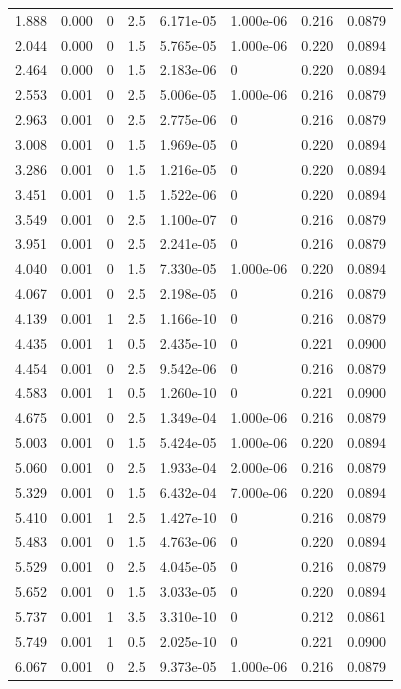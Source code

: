 \documentclass[preview]{standalone}
\begin{document}
{{\begin{tabular}{L{1.2cm}C{1.2cm} C{0.3cm}C{0.5cm} C{1.4cm}C{1.4cm} C{1.4cm}C{1.4cm}}
  1.888  &  0.000  & 0     & 2.5 &  6.171e-05  & 1.000e-06  & 0.216 &  0.0879   \\ 
  2.044  &  0.000  & 0     & 1.5 &  5.765e-05  & 1.000e-06  & 0.220 &  0.0894   \\ 
  2.464  &  0.000  & 0     & 1.5 &  2.183e-06  & 0  & 0.220 &  0.0894   \\ 
  2.553  &  0.001  & 0     & 2.5 &  5.006e-05  & 1.000e-06  & 0.216 &  0.0879   \\ 
  2.963  &  0.001  & 0     & 2.5 &  2.775e-06  & 0  & 0.216 &  0.0879   \\ 
  3.008  &  0.001  & 0     & 1.5 &  1.969e-05  & 0  & 0.220 &  0.0894   \\ 
  3.286  &  0.001  & 0     & 1.5 &  1.216e-05  & 0  & 0.220 &  0.0894   \\ 
  3.451  &  0.001  & 0     & 1.5 &  1.522e-06  & 0  & 0.220 &  0.0894   \\ 
  3.549  &  0.001  & 0     & 2.5 &  1.100e-07  & 0  & 0.216 &  0.0879   \\ 
  3.951  &  0.001  & 0     & 2.5 &  2.241e-05  & 0  & 0.216 &  0.0879   \\ 
  4.040  &  0.001  & 0     & 1.5 &  7.330e-05  & 1.000e-06  & 0.220 &  0.0894   \\ 
  4.067  &  0.001  & 0     & 2.5 &  2.198e-05  & 0  & 0.216 &  0.0879   \\ 
  4.139  &  0.001  & 1     & 2.5 &  1.166e-10  & 0  & 0.216 &  0.0879   \\ 
  4.435  &  0.001  & 1     & 0.5 &  2.435e-10  & 0  & 0.221 &  0.0900   \\ 
  4.454  &  0.001  & 0     & 2.5 &  9.542e-06  & 0  & 0.216 &  0.0879   \\ 
  4.583  &  0.001  & 1     & 0.5 &  1.260e-10  & 0  & 0.221 &  0.0900   \\ 
  4.675  &  0.001  & 0     & 2.5 &  1.349e-04  & 1.000e-06  & 0.216 &  0.0879   \\ 
  5.003  &  0.001  & 0     & 1.5 &  5.424e-05  & 1.000e-06  & 0.220 &  0.0894   \\ 
  5.060  &  0.001  & 0     & 2.5 &  1.933e-04  & 2.000e-06  & 0.216 &  0.0879   \\ 
  5.329  &  0.001  & 0     & 1.5 &  6.432e-04  & 7.000e-06  & 0.220 &  0.0894   \\ 
  5.410  &  0.001  & 1     & 2.5 &  1.427e-10  & 0  & 0.216 &  0.0879   \\ 
  5.483  &  0.001  & 0     & 1.5 &  4.763e-06  & 0  & 0.220 &  0.0894   \\ 
  5.529  &  0.001  & 0     & 2.5 &  4.045e-05  & 0  & 0.216 &  0.0879   \\ 
  5.652  &  0.001  & 0     & 1.5 &  3.033e-05  & 0  & 0.220 &  0.0894   \\ 
  5.737  &  0.001  & 1     & 3.5 &  3.310e-10  & 0  & 0.212 &  0.0861   \\ 
  5.749  &  0.001  & 1     & 0.5 &  2.025e-10  & 0  & 0.221 &  0.0900   \\ 
  6.067  &  0.001  & 0     & 2.5 &  9.373e-05  & 1.000e-06  & 0.216 &  0.0879   \\ 
\hline 
\end{tabular} 

}}
\end{document}
